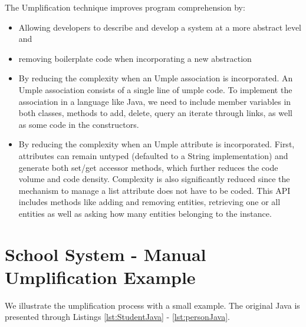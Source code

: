 The Umplification technique improves program comprehension by:
\begin{itemize}
\item Allowing developers to describe and develop a system at a more abstract level and

\item removing boilerplate code when incorporating a new abstraction

\item By reducing the complexity when an Umple association is incorporated. An Umple association consists of a single line of umple code. To implement the association in a language like Java, we need to include member variables in both classes, methods to add, delete, query an iterate through links, as well as some code in the constructors.

\item By reducing the complexity when an Umple attribute is incorporated. First, attributes can remain untyped (defaulted to a String implementation) and generate both set/get accessor methods, which further reduces the code volume and code density. Complexity is also significantly reduced since the mechanism to manage a list attribute does not have to be coded. This API includes methods like adding and removing entities, retrieving one or all entities as well as asking how many entities belonging to the instance.
\end{itemize}

\section{School System - Manual Umplification Example}
We illustrate the umplification process with a small example. The original Java is presented through Listings \ref{lst:StudentJava} - \ref{lst:personJava}.

